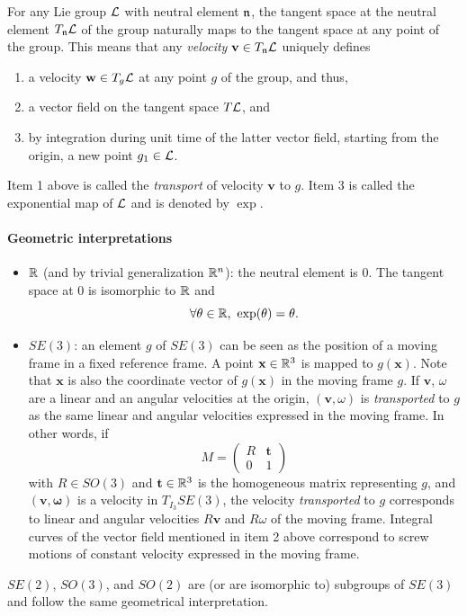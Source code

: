For any Lie group $\mathcal{L}$ with neutral element $\mathfrak{n}$, the tangent space at the neutral element $T_{\mathfrak{n}}\mathcal{L}$ of the group naturally maps to the tangent space at any point of the group. This means that any \textit{velocity} $\mathbf{v}\in T_{\mathfrak{n}}\mathcal{L}$ uniquely defines
\begin{enumerate}
\item a velocity $\mathbf{w}\in T_{g}\mathcal{L}$ at any point $g$ of the group, and thus,
\item a vector field on the tangent space $T\mathcal{L}$, and
\item by integration during unit time of the latter vector field, starting from the origin, a new point $g_{1}\in\mathcal{L}$.
\end{enumerate}
Item 1 above is called the \textit{transport} of velocity $\mathbf{v}$ to $g$.
Item 3 is called the exponential map of $\mathcal{L}$ and is denoted by $\exp$.

\paragraph{Geometric interpretations}
\begin{itemize}
\item $\mathbb{R}$ (and by trivial generalization $\mathbb{R}^n$): the neutral element is $0$. The tangent space at 0 is isomorphic to $\mathbb{R}$ and
  $$
  \forall \theta\in\mathbb{R},\  \exp(\theta) = \theta.
  $$
\item $SE(3)$: an element $g$ of $SE(3)$ can be seen as the position of a moving frame in a fixed reference frame. A point $\mathbf{x}\in\mathbb{R}^3$ is mapped to $g(\mathbf{x})$. Note that $\mathbf{x}$ is also the coordinate vector of $g(\mathbf{x})$ in the moving frame $g$. If $\mathbf{v}$, $\omega$ are a linear and an angular velocities at the origin, $(\mathbf{v},\omega)$ is \textit{transported} to $g$
  as the same linear and angular velocities expressed in the moving frame. In other words, if
  \begin{equation}\label{eq:homogeneous matrix}
  M=\left(\begin{array}{ll} R & \mathbf{t}\\ 0 & 1\end{array}\right)
    \end{equation}
  with $R\in SO(3)$ and $\mathbf{t}\in\mathbb{R}^3$  is the homogeneous matrix
  representing $g$, and $(\mathbf{v},\mathbf{\omega})$ is a velocity in $T_{I_3}SE(3)$, the velocity \textit{transported} to $g$ corresponds to linear and angular velocities $R\mathbf{v}$ and $R\omega$ of the moving frame.
  Integral curves of the vector field mentioned in item 2 above correspond to screw motions of constant velocity expressed in the moving frame.
\end{itemize}
$SE(2)$, $SO(3)$, and $SO(2)$ are (or are isomorphic to) subgroups of $SE(3)$ and follow the same geometrical interpretation.

